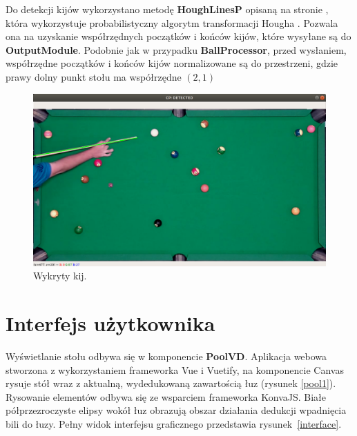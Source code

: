 \documentclass[12pt]{article}
\begin{document}
\newpage

Do detekcji kijów wykorzystano metodę \textbf{HoughLinesP} opisaną na stronie \cite{HoughLinesP}, która wykorzystuje probabilistyczny algorytm transformacji Hougha \cite{ProbabilisticHoughTransform}. Pozwala ona na uzyskanie współrzędnych początków i końców kijów, które wysyłane są do \textbf{OutputModule}. Podobnie jak w przypadku \textbf{BallProcessor}, przed wysłaniem, współrzędne początków i końców kijów normalizowane są do przestrzeni, gdzie prawy dolny punkt stołu ma współrzędne $(2, 1)$

\begin{figure}[!htb]
    \centering
    \includegraphics[width=15cm]{./images/obrazki/cp/cue_detected.png}
    \caption{Wykryty kij.}
    \label{cue_detected}
\end{figure}



\section{Interfejs użytkownika}

Wyświetlanie stołu odbywa się w komponencie \textbf{PoolVD}. Aplikacja webowa stworzona z wykorzystaniem frameworka Vue i Vuetify, na komponencie Canvas rysuje stół wraz z aktualną, wydedukowaną zawartością łuz (rysunek \ref{pool1}). Rysowanie elementów odbywa się ze wsparciem frameworka KonvaJS\cite{konva}. Białe półprzezroczyste elipsy wokół łuz obrazują obszar działania dedukcji wpadnięcia bili do łuzy. Pełny widok interfejsu graficznego przedstawia rysunek~\ref{interface}.
\end{document}
